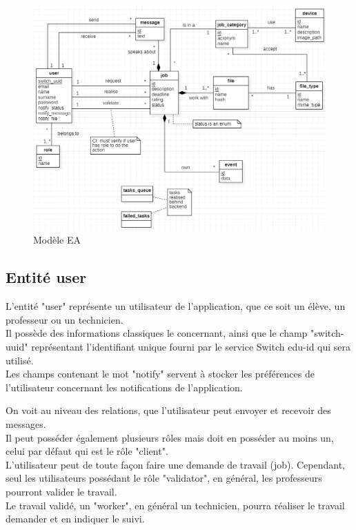 \documentclass[
    iai, %
    il, %
]{heig-tb}
\begin{document}
\begin{center}
    \begin{figure}
        \includegraphics[width=\textwidth]{./assets/figures/ea.png}
        \caption{Modèle EA \label{ea}}
    \end{figure}
\end{center}

\subsection{Entité user}
L'entité "user" représente un utilisateur de l'application, que ce soit un élève, un professeur ou un technicien.\\
Il possède des informations classiques le concernant, ainsi que le champ "switch-uuid" représentant l'identifiant unique fourni par le service Switch edu-id qui sera utilisé.\\
Les champs contenant le mot "notify" servent à stocker les préférences de l'utilisateur concernant les notifications de l'application.

On voit au niveau des relations, que l'utilisateur peut envoyer et recevoir des messages.\\
Il peut posséder également plusieurs rôles mais doit en posséder au moins un, celui par défaut qui est le rôle "client".\\
L'utilisateur peut de toute façon faire une demande de travail (job). Cependant, seul les utilisateurs possédant le rôle "validator", en général, les professeurs pourront valider le travail.\\
Le travail validé, un "worker", en général un technicien, pourra réaliser le travail demander et en indiquer le suivi.
\end{document}
